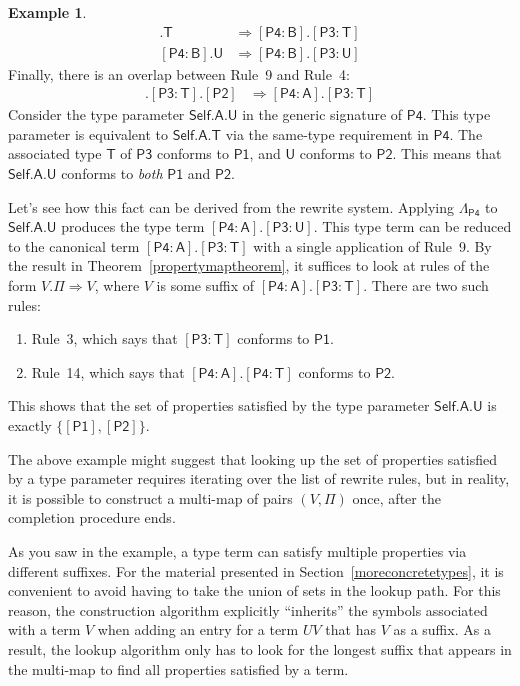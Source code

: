 \documentclass[headsepline,bibliography=totoc]{scrreport}
\newcommand{\namesym}[1]{\mathsf{#1}}
\newcommand{\genericparam}[1]{\bm{\mathsf{#1}}}
\newcommand{\proto}[1]{\bm{\mathsf{#1}}}
\newcommand{\protosym}[1]{[\proto{#1}]}
\newcommand{\assocsym}[2]{[\proto{#1}\colon\namesym{#2}]}
\theoremstyle{definition}
\newtheorem{example}{Example}[chapter]
\theoremstyle{definition}
\theoremstyle{definition}
\begin{document}
\begin{example}
\begin{align}
\assocsym{P4}{B}.\namesym{T}&\Rightarrow\assocsym{P4}{B}.\assocsym{P3}{T}\tag{12}\\
\assocsym{P4}{B}.\namesym{U}&\Rightarrow\assocsym{P4}{B}.\assocsym{P3}{U}\tag{13}
\end{align}
Finally, there is an overlap between Rule~9 and Rule~4:
\begin{align}
\assocsym{P4}{A}.\assocsym{P3}{T}.\protosym{P2}&\Rightarrow\assocsym{P4}{A}.\assocsym{P3}{T}\tag{14}
\end{align}
Consider the type parameter $\genericparam{Self}.\namesym{A}.\namesym{U}$ in the generic signature of $\proto{P4}$. This type parameter is equivalent to $\genericparam{Self}.\namesym{A}.\namesym{T}$ via the same-type requirement in $\proto{P4}$. The associated type $\namesym{T}$ of $\proto{P3}$ conforms to $\proto{P1}$, and $\namesym{U}$ conforms to $\proto{P2}$. This means that $\genericparam{Self}.\namesym{A}.\namesym{U}$ conforms to \emph{both} $\proto{P1}$ and $\proto{P2}$.

Let's see how this fact can be derived from the rewrite system. Applying $\Lambda_{\proto{P4}}$ to $\genericparam{Self}.\namesym{A}.\namesym{U}$ produces the type term $\assocsym{P4}{A}.\assocsym{P3}{U}$. This type term can be reduced to the canonical term $\assocsym{P4}{A}.\assocsym{P3}{T}$ with a single application of Rule~9. By the result in Theorem~\ref{propertymaptheorem}, it suffices to look at rules of the form $V.\Pi\Rightarrow V$, where $V$ is some suffix of $\assocsym{P4}{A}.\assocsym{P3}{T}$. There are two such rules:
\begin{enumerate}
\item Rule~3, which says that $\assocsym{P3}{T}$ conforms to $\proto{P1}$.
\item Rule~14, which says that $\assocsym{P4}{A}.\assocsym{P4}{T}$ conforms to $\proto{P2}$.
\end{enumerate}
This shows that the set of properties satisfied by the type parameter $\genericparam{Self}.\namesym{A}.\namesym{U}$ is exactly $\{\protosym{P1},\protosym{P2}\}$.
\end{example}
The above example might suggest that looking up the set of properties satisfied by a type parameter requires iterating over the list of rewrite rules, but in reality, it is possible to construct a multi-map of pairs $(V, \Pi)$ once, after the completion procedure ends.

As you saw in the example, a type term can satisfy multiple properties via different suffixes. For the material presented in Section~\ref{moreconcretetypes}, it is convenient to avoid having to take the union of sets in the lookup path. For this reason, the construction algorithm explicitly
``inherits'' the symbols associated with a term $V$ when adding an entry for a term $UV$ that has $V$ as a suffix. As a result, the lookup algorithm only has to look for the longest suffix that appears in the multi-map to find all properties satisfied by a term.
\end{document}
